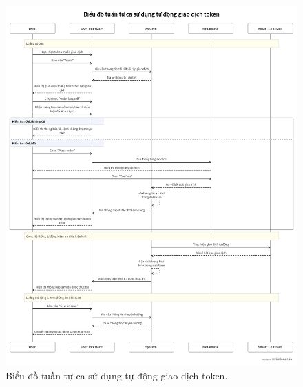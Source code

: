 \begin{figure}[H]
    \centering
    \includegraphics[width=1\textwidth]{figures/c2/AutoTradeSeq.png}
    \caption{Biểu đồ tuần tự ca sử dụng tự động giao dịch token.}
    \label{fig:architecture-diagram}
\end{figure}

